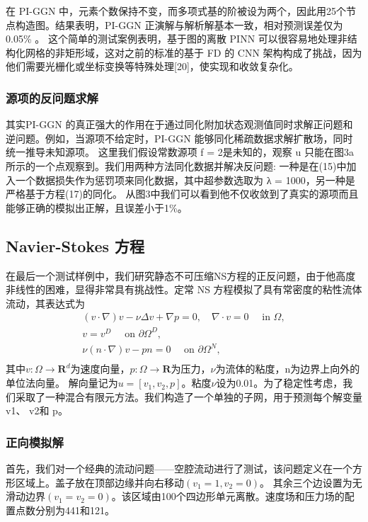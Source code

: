 在 PI-GGN 中，元素个数保持不变，而多项式基的阶被设为两个，因此用25个节点构造图。结果表明，PI-GGN 正演解与解析解基本一致，相对预测误差仅为0.05\% 。
这个简单的测试案例表明，基于图的离散 PINN 可以很容易地处理非结构化网格的非矩形域，这对之前的标准的基于 FD 的 CNN 架构构成了挑战，因为他们需要光栅化或坐标变换等特殊处理[20]，使实现和收敛复杂化。
\subsubsection{源项的反问题求解}
其实PI-GGN 的真正强大的作用在于通过同化附加状态观测值同时求解正问题和逆问题。例如，当源项不给定时，PI-GGN 能够同化稀疏数据求解扩散场，同时统一推导未知源项。
这里我们假设常数源项 f = 2是未知的，观察 u 只能在图3a 所示的一个点观察到。我们用两种方法同化数据并解决反问题: 
一种是在(15)中加入一个数据损失作为惩罚项来同化数据，其中超参数选取为 λ = 1000，另一种是严格基于方程(17)的同化。
从图3中我们可以看到他不仅收敛到了真实的源项而且能够正确的模拟出正解，且误差小于1\%。

\subsection{Navier-Stokes 方程}
在最后一个测试样例中，我们研究静态不可压缩NS方程的正反问题，由于他高度非线性的困难，显得非常具有挑战性。定常 NS 方程模拟了具有常密度的粘性流体流动，其表达式为
$$\begin{array}{l}
    (v \cdot \nabla) v-\nu \Delta v+\nabla p=0, \quad \nabla \cdot v=0 \quad \text { in } \Omega, \\
    v=v^{D} \quad \text { on } \partial \Omega^{D} \text {, } \\
    \nu(n \cdot \nabla) v-p n=0 \quad \text { on } \partial \Omega^{N} \text {, } \\
\end{array}$$
其中$v:\Omega\rightarrow \mathbf{R}^d$为速度向量，$p:\Omega\rightarrow \mathbf{R}$为压力，$\nu$为流体的粘度，n为边界上向外的单位法向量。
解向量记为$u=[v_1,v_2,p]$。粘度$\nu$设为0.01。为了稳定性考虑，我们采取了一种混合有限元方法。我们构造了一个单独的子网，用于预测每个解变量 v1、 v2和 p。

\subsubsection{正向模拟解}
首先，我们对一个经典的流动问题——空腔流动进行了测试，该问题定义在一个方形区域上。盖子放在顶部边缘并向右移动$(v_1 = 1, v_2 = 0)$。
其余三个边设置为无滑动边界$(v_1 = v_2 = 0)$。该区域由100个四边形单元离散。速度场和压力场的配置点数分别为441和121。

